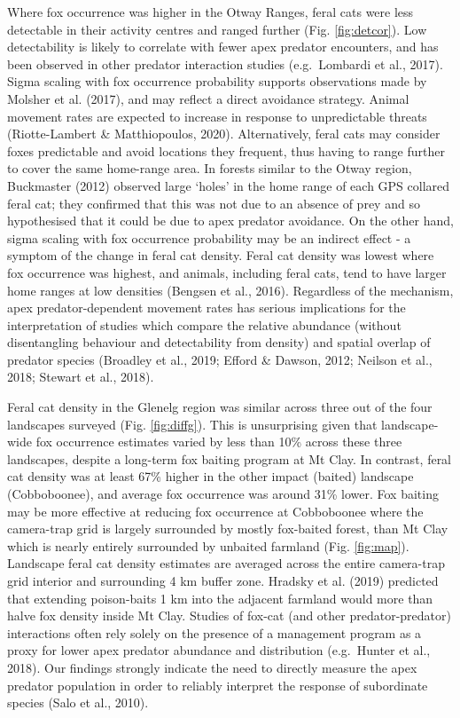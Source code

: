 \documentclass[]{elsarticle} %
\begin{document}
Where fox occurrence was higher in the Otway Ranges, feral cats were less detectable in their activity centres and ranged further (Fig. \ref{fig:detcor}). Low detectability is likely to correlate with fewer apex predator encounters, and has been observed in other predator interaction studies (e.g.~Lombardi et al., 2017). Sigma scaling with fox occurrence probability supports observations made by Molsher et al. (2017), and may reflect a direct avoidance strategy. Animal movement rates are expected to increase in response to unpredictable threats (Riotte-Lambert \& Matthiopoulos, 2020). Alternatively, feral cats may consider foxes predictable and avoid locations they frequent, thus having to range further to cover the same home-range area. In forests similar to the Otway region, Buckmaster (2012) observed large `holes' in the home range of each GPS collared feral cat; they confirmed that this was not due to an absence of prey and so hypothesised that it could be due to apex predator avoidance. On the other hand, sigma scaling with fox occurrence probability may be an indirect effect - a symptom of the change in feral cat density. Feral cat density was lowest where fox occurrence was highest, and animals, including feral cats, tend to have larger home ranges at low densities (Bengsen et al., 2016). Regardless of the mechanism, apex predator-dependent movement rates has serious implications for the interpretation of studies which compare the relative abundance (without disentangling behaviour and detectability from density) and spatial overlap of predator species (Broadley et al., 2019; Efford \& Dawson, 2012; Neilson et al., 2018; Stewart et al., 2018).

Feral cat density in the Glenelg region was similar across three out of the four landscapes surveyed (Fig. \ref{fig:diffg}). This is unsurprising given that landscape-wide fox occurrence estimates varied by less than 10\% across these three landscapes, despite a long-term fox baiting program at Mt Clay. In contrast, feral cat density was at least 67\% higher in the other impact (baited) landscape (Cobboboonee), and average fox occurrence was around 31\% lower. Fox baiting may be more effective at reducing fox occurrence at Cobboboonee where the camera-trap grid is largely surrounded by mostly fox-baited forest, than Mt Clay which is nearly entirely surrounded by unbaited farmland (Fig. \ref{fig:map}). Landscape feral cat density estimates are averaged across the entire camera-trap grid interior and surrounding 4 km buffer zone. Hradsky et al. (2019) predicted that extending poison-baits 1 km into the adjacent farmland would more than halve fox density inside Mt Clay. Studies of fox-cat (and other predator-predator) interactions often rely solely on the presence of a management program as a proxy for lower apex predator abundance and distribution (e.g.~Hunter et al., 2018). Our findings strongly indicate the need to directly measure the apex predator population in order to reliably interpret the response of subordinate species (Salo et al., 2010).
\end{document}

